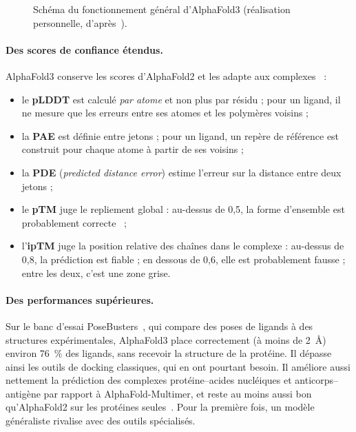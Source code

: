 \begin{figure}[H]
  \centering
  \resizebox{\textwidth}{!}{}
  \caption{Schéma du fonctionnement général d'AlphaFold3 (réalisation personnelle, d'après~\cite{abramson2024}).}
  \label{fig:schema_af3}
\end{figure}

\paragraph{Des scores de confiance étendus.} AlphaFold3 conserve les scores d'AlphaFold2 et les adapte aux complexes~\cite{abramson2024,alphafold_server} :
\begin{itemize}
  \item le \textbf{pLDDT} est calculé \emph{par atome} et non plus par résidu ; pour un ligand, il ne mesure que les erreurs entre ses atomes et les polymères voisins ;
  \item la \textbf{PAE} est définie entre jetons ; pour un ligand, un repère de référence est construit pour chaque atome à partir de ses voisins ;
  \item la \textbf{PDE} (\emph{predicted distance error}) estime l'erreur sur la distance entre deux jetons ;
  \item le \textbf{pTM} juge le repliement global : au-dessus de 0,5, la forme d'ensemble est probablement correcte~\cite{zhang2004} ;
  \item l'\textbf{ipTM} juge la position relative des chaînes dans le complexe : au-dessus de 0,8, la prédiction est fiable ; en dessous de 0,6, elle est probablement fausse ; entre les deux, c'est une zone grise.
\end{itemize}

\paragraph{Des performances supérieures.} Sur le banc d'essai PoseBusters~\cite{buttenschoen2024}, qui compare des poses de ligands à des structures expérimentales, AlphaFold3 place correctement (à moins de 2~Å) environ 76~\% des ligands, sans recevoir la structure de la protéine. Il dépasse ainsi les outils de docking classiques, qui en ont pourtant besoin. Il améliore aussi nettement la prédiction des complexes protéine--acides nucléiques et anticorps--antigène par rapport à AlphaFold-Multimer, et reste au moins aussi bon qu'AlphaFold2 sur les protéines seules~\cite{abramson2024}. Pour la première fois, un modèle généraliste rivalise avec des outils spécialisés.

